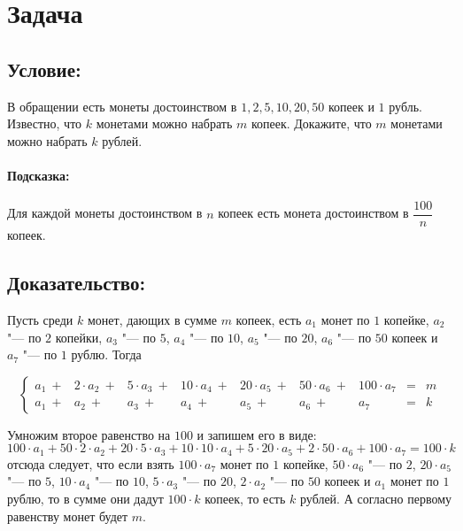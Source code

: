 \section{Задача}

\subsection*{Условие:}
В обращении есть монеты достоинством в $1, 2, 5, 10, 20, 50$ копеек и $1$ рубль. Известно, что $k$ 
монетами можно набрать $m$ копеек. Докажите, что $m$ монетами можно набрать $k$ рублей.

\paragraph*{Подсказка:}
Для каждой монеты достоинством в $n$ копеек есть монета достоинством в $\dfrac{100}{n}$ копеек.

\subsection*{Доказательство:}
Пусть среди $k$ монет, дающих в сумме $m$ копеек, есть $a_1$ монет по $1$ копейке, $a_2$ "--- по 
$2$ копейки, $a_3$ "--- по $5$, $a_4$ "--- по $10$, $a_5$ "--- по $20$, $a_6$ "--- по $50$ копеек и
$a_7$ "--- по $1$ рублю. Тогда

\begin {equation*}
    \left\lbrace 
        \begin {array}  {rrrrrrrcl}
            a_1 \ + &
            2 \cdot a_2 \ + &
            5 \cdot a_3 \ + &
            10 \cdot a_4 \ + &
            20 \cdot a_5 \ + &
            50 \cdot a_6 \ + &
            100 \cdot a_7 &
            = &
            m
            \\
            a_1 \ + & a_2 \ + & a_3 \ + & a_4 \ + & a_5 \ + & a_6 \ + & a_7 & = & k
        \end {array}
    \right.
\end {equation*}

Умножим второе равенство на $100$ и запишем его в виде:
$$
    100 \cdot a_1 +
    50 \cdot 2 \cdot a_2 +
    20 \cdot 5 \cdot a_3 +
    10 \cdot 10 \cdot a_4 +
    5 \cdot 20 \cdot a_5 +
    2 \cdot 50 \cdot a_6 +
    100 \cdot a_7
    =
    100 \cdot k
$$
\noindent отсюда следует, что если взять $100 \cdot a_7$ монет по $1$ копейке, $50 \cdot a_6$ "---
по $2$, $20 \cdot a_5$ "--- по $5$, $10 \cdot a_4$ "--- по $10$, $5 \cdot a_3$ "--- по $20$,
$2 \cdot a_2$ "--- по $50$ копеек и $a_1$ монет по $1$ рублю, то в сумме они дадут
$100 \cdot k$ копеек, то есть $k$ рублей. А согласно первому равенству монет будет $m$.